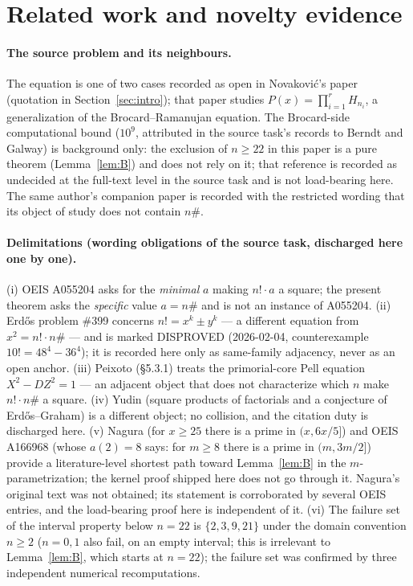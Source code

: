 \documentclass[11pt]{article}
\theoremstyle{definition}
\begin{document}
\section{Related work and novelty evidence}\label{sec:related}

\paragraph{The source problem and its neighbours.} The equation is one of
two cases recorded as open in Novakovi\'c's paper \cite{novakovic2026}
(quotation in Section~\ref{sec:intro}); that paper studies
$P(x) = \prod_{i=1}^{r} H_{n_i}$, a generalization of the Brocard--Ramanujan
equation. The Brocard-side computational bound ($10^{9}$, attributed in the
source task's records to Berndt and Galway) is background only: the exclusion
of $n \ge 22$ in this paper is a pure theorem (Lemma~\ref{lem:B}) and does
not rely on it; that reference is recorded as undecided at the full-text
level in the source task and is not load-bearing here. The same author's
companion paper \cite{novakovic2026b} is recorded with the restricted
wording that its object of study does not contain $n\#$.

\paragraph{Delimitations (wording obligations of the source task, discharged
here one by one).}
(i) OEIS A055204 \cite{oeisA055204} asks for the \emph{minimal} $a$ making
$n! \cdot a$ a square; the present theorem asks the \emph{specific} value
$a = n\#$ and is not an instance of A055204.
(ii) Erd\H{o}s problem \#399 \cite{erdos399} concerns $n! = x^{k} \pm y^{k}$
--- a different equation from $x^2 = n! \cdot n\#$ --- and is marked
DISPROVED (2026-02-04, counterexample $10! = 48^{4} - 36^{4}$); it is
recorded here only as same-family adjacency, never as an open anchor.
(iii) Peixoto \cite{peixoto2026} (\S 5.3.1) treats the primorial-core Pell
equation $X^{2} - D Z^{2} = 1$ --- an adjacent object that does not
characterize which $n$ make $n! \cdot n\#$ a square.
(iv) Yudin \cite{yudin2026} (square products of factorials and a conjecture
of Erd\H{o}s--Graham) is a different object; no collision, and the citation
duty is discharged here.
(v) Nagura \cite{nagura1952} (for $x \ge 25$ there is a prime in
$(x, 6x/5]$) and OEIS A166968 \cite{oeisA166968} (whose $a(2) = 8$ says: for
$m \ge 8$ there is a prime in $(m, 3m/2]$) provide a literature-level
shortest path toward Lemma~\ref{lem:B} in the $m$-parametrization; the
kernel proof shipped here does not go through it. Nagura's original text was
not obtained; its statement is corroborated by several OEIS
entries, and the load-bearing proof here is independent of it.
(vi) The failure set of the interval property below $n = 22$ is
$\{2,3,9,21\}$ under the domain convention $n \ge 2$ ($n = 0, 1$ also fail,
on an empty interval; this is irrelevant to Lemma~\ref{lem:B}, which starts
at $n = 22$); the failure set was confirmed by three independent numerical
recomputations.
\end{document}
